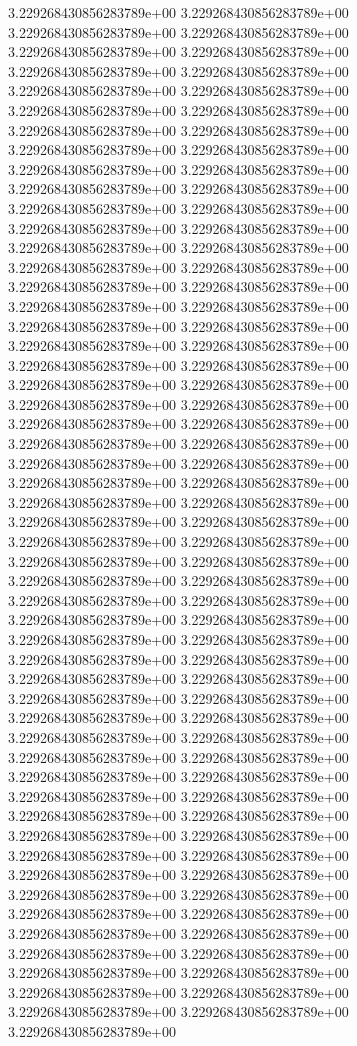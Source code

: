 3.229268430856283789e+00	3.229268430856283789e+00	3.229268430856283789e+00	3.229268430856283789e+00	3.229268430856283789e+00	3.229268430856283789e+00	3.229268430856283789e+00	3.229268430856283789e+00	3.229268430856283789e+00	3.229268430856283789e+00	3.229268430856283789e+00	3.229268430856283789e+00	3.229268430856283789e+00	3.229268430856283789e+00	3.229268430856283789e+00	3.229268430856283789e+00	3.229268430856283789e+00	3.229268430856283789e+00	3.229268430856283789e+00	3.229268430856283789e+00	3.229268430856283789e+00	3.229268430856283789e+00	3.229268430856283789e+00	3.229268430856283789e+00	3.229268430856283789e+00	3.229268430856283789e+00	3.229268430856283789e+00	3.229268430856283789e+00	3.229268430856283789e+00	3.229268430856283789e+00	3.229268430856283789e+00	3.229268430856283789e+00	3.229268430856283789e+00	3.229268430856283789e+00	3.229268430856283789e+00	3.229268430856283789e+00	3.229268430856283789e+00	3.229268430856283789e+00	3.229268430856283789e+00	3.229268430856283789e+00	3.229268430856283789e+00	3.229268430856283789e+00	3.229268430856283789e+00	3.229268430856283789e+00	3.229268430856283789e+00	3.229268430856283789e+00	3.229268430856283789e+00	3.229268430856283789e+00	3.229268430856283789e+00	3.229268430856283789e+00	3.229268430856283789e+00	3.229268430856283789e+00	3.229268430856283789e+00	3.229268430856283789e+00	3.229268430856283789e+00	3.229268430856283789e+00	3.229268430856283789e+00	3.229268430856283789e+00	3.229268430856283789e+00	3.229268430856283789e+00	3.229268430856283789e+00	3.229268430856283789e+00	3.229268430856283789e+00	3.229268430856283789e+00	3.229268430856283789e+00	3.229268430856283789e+00	3.229268430856283789e+00	3.229268430856283789e+00	3.229268430856283789e+00	3.229268430856283789e+00	3.229268430856283789e+00	3.229268430856283789e+00	3.229268430856283789e+00	3.229268430856283789e+00	3.229268430856283789e+00	3.229268430856283789e+00	3.229268430856283789e+00	3.229268430856283789e+00	3.229268430856283789e+00	3.229268430856283789e+00	3.229268430856283789e+00	3.229268430856283789e+00	3.229268430856283789e+00	3.229268430856283789e+00	3.229268430856283789e+00	3.229268430856283789e+00	3.229268430856283789e+00	3.229268430856283789e+00	3.229268430856283789e+00	3.229268430856283789e+00	3.229268430856283789e+00	3.229268430856283789e+00	3.229268430856283789e+00	3.229268430856283789e+00	3.229268430856283789e+00	3.229268430856283789e+00	3.229268430856283789e+00	3.229268430856283789e+00	3.229268430856283789e+00	3.229268430856283789e+00	3.229268430856283789e+00	3.229268430856283789e+00	3.229268430856283789e+00	3.229268430856283789e+00	3.229268430856283789e+00
